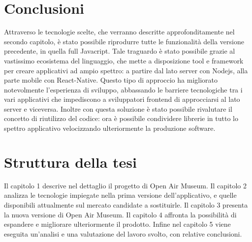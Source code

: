 \section{Conclusioni}\vspace{5mm}

Attraverso le tecnologie scelte, che verranno descritte approfonditamente nel secondo capitolo, è stato possibile riprodurre tutte le funzionalità della versione precedente, in quella full Javacript. Tale traguardo è stato possibile grazie al vastissimo ecosistema del linguaggio, che mette a disposizione tool e framework per creare applicativi ad ampio spettro: a partire dal lato server con Nodejs, alla parte mobile con React-Native. Questo tipo di approccio ha migliorato notevolmente l'esperienza di sviluppo, abbassando le barriere tecnologiche tra i vari applicativi che impediscono a sviluppatori frontend di approcciarsi al lato server e viceversa. Inoltre con questa soluzione è stato possibile rivalutare il concetto di riutilizzo del codice: ora è possibile condividere librerie in tutto lo spettro applicativo velocizzando ulteriormente la produzione software.
	
\section{Struttura della tesi}\vspace{5mm}
	
Il capitolo 1 descrive nel dettaglio il progetto di Open Air Museum. Il capitolo 2 analizza le tecnologie impiegate nella prima versione dell'applicativo, e quelle disponibili attualmente sul mercato candidate a sostituirle. Il capitolo 3 presenta la nuova versione di Open Air Museum. Il capitolo 4 affronta la possibilità di espandere e migliorare ulteriormente il prodotto. Infine nel capitolo 5 viene eseguita un’analisi e una valutazione del lavoro svolto, con relative conclusioni. 


